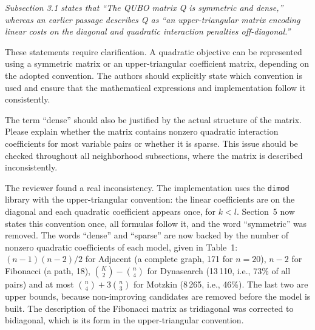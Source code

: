 \documentclass[12pt]{article}
\newenvironment{rc}[1]{\par\medskip\noindent\itshape\renewcommand{\emph}[1]{\textbf{##1}}\ignorespaces}{\par}
\newcommand{\answer}[1]{\par\smallskip\noindent #1\par}
\begin{document}
\begin{rc}{R2 3 --- Matrix structure and terminology}
Subsection 3.1 states that ``The QUBO matrix Q is symmetric and dense,'' whereas an earlier passage describes Q as ``an upper-triangular matrix encoding linear costs on the diagonal and quadratic interaction penalties off-diagonal.''

These statements require clarification. A quadratic objective can be represented using a symmetric matrix or an upper-triangular coefficient matrix, depending on the adopted convention. The authors should explicitly state which convention is used and ensure that the mathematical expressions and implementation follow it consistently.

The term ``dense'' should also be justified by the actual structure of the matrix. Please explain whether the matrix contains nonzero quadratic interaction coefficients for most variable pairs or whether it is sparse. This issue should be checked throughout all neighborhood subsections, where the matrix is described inconsistently.
\end{rc}
\answer{The reviewer found a real inconsistency. The implementation uses the \texttt{dimod} library with the upper-triangular convention: the linear coefficients are on the diagonal and each quadratic coefficient appears once, for $k<l$. Section~5 now states this convention once, all formulas follow it, and the word ``symmetric'' was removed. The words ``dense'' and ``sparse'' are now backed by the number of nonzero quadratic coefficients of each model, given in Table~1: $(n-1)(n-2)/2$ for Adjacent (a complete graph, 171 for $n=20$), $n-2$ for Fibonacci (a path, 18), $\binom{K}{2}-\binom{n}{4}$ for Dynasearch (13\,110, i.e., 73\% of all pairs) and at most $\binom{n}{4}+3\binom{n}{3}$ for Motzkin (8\,265, i.e., 46\%). The last two are upper bounds, because non-improving candidates are removed before the model is built. The description of the Fibonacci matrix as tridiagonal was corrected to bidiagonal, which is its form in the upper-triangular convention.}
\end{document}
